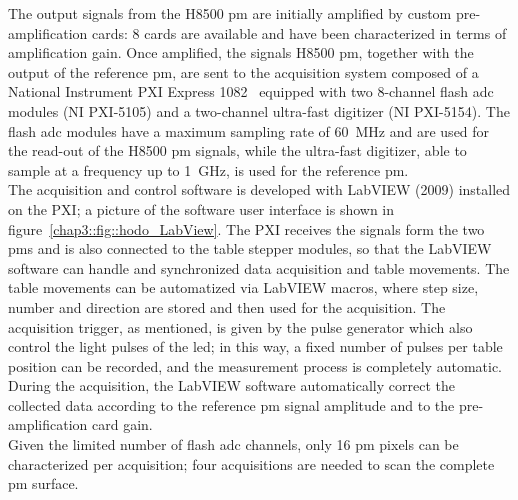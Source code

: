 The output signals from the H8500 \gls{pm} are initially amplified by custom pre-amplification cards: 8 cards are available and have been characterized in terms of amplification gain. Once amplified, the signals H8500 \gls{pm}, together with the output of the reference \gls{pm}, are sent to the acquisition system composed of a National Instrument PXI Express 1082~\parencite{NationalInstruments2010} equipped with two 8-channel flash \gls{adc} modules (NI PXI-5105) and a two-channel ultra-fast digitizer (NI PXI-5154). The flash \gls{adc} modules have a maximum sampling rate of 60~MHz and are used for the read-out of the H8500 \gls{pm} signals, while the ultra-fast digitizer, able to sample at a frequency up to 1~GHz, is used for the reference \gls{pm}.\\
The acquisition and control software is developed with LabVIEW (2009) installed on the PXI; a picture of the software user interface is shown in figure~\ref{chap3::fig::hodo_LabView}. The PXI receives the signals form the two \glspl{pm} and is also connected to the table stepper modules, so that the LabVIEW software can handle and synchronized data acquisition and table movements. The table movements can be automatized via LabVIEW macros, where step size, number and direction are stored and then used for the acquisition. The acquisition trigger, as mentioned, is given by the pulse generator which also control the light pulses of the \gls{led}; in this way, a fixed number of pulses per table position can be recorded, and the measurement process is completely automatic. During the acquisition, the LabVIEW software automatically correct the collected data according to the reference \gls{pm} signal amplitude and to the pre-amplification card gain.\\
Given the limited number of flash \gls{adc} channels, only 16 \gls{pm} pixels can be characterized per acquisition; four acquisitions are needed to scan the complete \gls{pm} surface.\\
 
